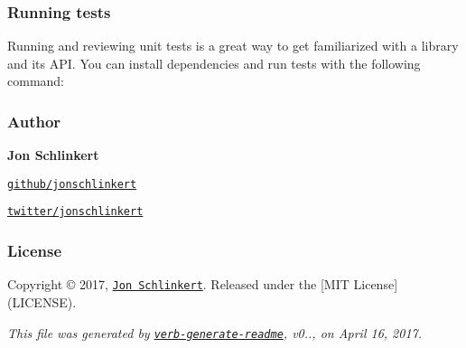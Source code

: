 \subsubsection*{Running tests}

Running and reviewing unit tests is a great way to get familiarized with a library and its A\+PI. You can install dependencies and run tests with the following command\+:




\subsubsection*{Author}

{\bfseries Jon Schlinkert}


\begin{DoxyItemize}
\item \href{https://github.com/jonschlinkert}{\tt github/jonschlinkert}
\item \href{https://twitter.com/jonschlinkert}{\tt twitter/jonschlinkert}
\end{DoxyItemize}

\subsubsection*{License}

Copyright © 2017, \href{https://github.com/jonschlinkert}{\tt Jon Schlinkert}. Released under the \mbox{[}M\+IT License\mbox{]}(L\+I\+C\+E\+N\+SE).





{\itshape This file was generated by \href{https://github.com/verbose/verb-generate-readme}{\tt verb-\/generate-\/readme}, v0.., on April 16, 2017.} 
